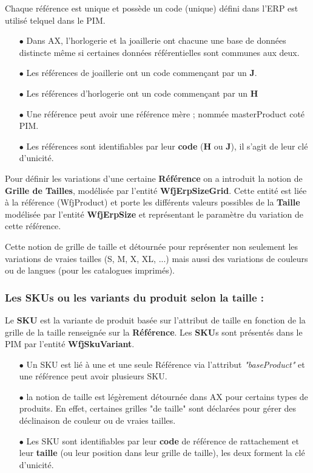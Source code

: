 Chaque référence est unique et possède un code (unique) défini dans l'ERP est utilisé telquel dans le PIM.
\medskip
\begin{itemize}
    \item[$\bullet$] Dans AX, l'horlogerie et la joaillerie ont chacune une base de données distincte même si certaines données référentielles sont communes aux deux.
    \smallskip
    \item[$\bullet$] Les références de joaillerie ont un code commençant par un \textbf{J}.
    \smallskip
    \item[$\bullet$] Les références d'horlogerie ont un code commençant par un \textbf{H}
    \smallskip
    \item[$\bullet$] Une référence peut avoir une référence mère ; nommée masterProduct coté PIM.
    \smallskip
    \item[$\bullet$] Les références sont identifiables par leur \textbf{code} (\textbf{H} ou \textbf{J}), il s'agit de leur clé d'unicité.

\end{itemize}
\medskip

Pour définir les variations d'une certaine \textbf{Référence} on a introduit la notion de \textbf{Grille de Tailles}, modélisée par l'entité \textbf{WfjErpSizeGrid}. Cette entité est liée à la référence (WfjProduct) et porte les différents valeurs possibles de la \textbf{Taille} modélisée par l'entité \textbf{WfjErpSize} et représentant le paramètre du variation de cette référence.
\medskip

Cette notion de grille de taille et détournée pour représenter non seulement les variations de vraies tailles (S, M, X, XL, ...) mais aussi des variations de couleurs ou de langues (pour les catalogues imprimés).

\subsubsection{Les SKUs ou les variants du produit selon la taille :}
Le \textbf{SKU} est la variante de produit basée sur l'attribut de taille en fonction de la grille de la taille renseignée sur la \textbf{Référence}. Les \textbf{SKU}s sont présentés dans le PIM par l'entité \textbf{WfjSkuVariant}.
\bigskip
\begin{itemize}
    \item[$\bullet$] Un SKU est lié à une et une seule Référence via l'attribut \textit{"baseProduct"} et une référence peut avoir plusieurs SKU.
    \smallskip
    \item[$\bullet$] la notion de taille est légèrement détournée dans AX pour certains types de produits. En effet, certaines grilles "de taille" sont déclarées pour gérer des déclinaison de couleur ou de vraies tailles.
    \smallskip
    \item[$\bullet$] Les SKU sont identifiables par leur \textbf{code} de référence de rattachement et leur \textbf{taille} (ou leur position dans leur grille de taille), les deux forment la clé d'unicité.
\end{itemize}

